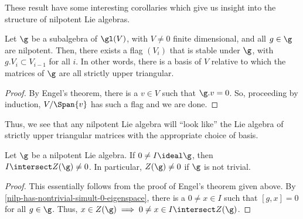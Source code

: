 \documentclass[11pt,leqno,oneside]{amsart}
\numberwithin{thm}{section}
\begin{document}
These result have some interesting corollaries which give us insight
into the structure of nilpotent Lie algebras. 
\begin{cor}
  Let \(\g\) be a subalgebra of \(\gl(V)\), with \(V \neq 0\) finite
  dimensional, and all \(g \in \g\) are nilpotent. Then, there exists
  a flag \((V_i)\) that is stable under \(\g\), with \(g.V_i \subset
  V_{i-1}\) for all \(i\). In other words, there is a basis of \(V\)
  relative to which the matrices of \(\g\) are all strictly upper
  triangular.
\end{cor}
\begin{proof}
  By Engel's theorem, there is a \(v \in V\) such that \(\g.v =
  0\). So, proceeding by induction, \(V/ \Span\{v\}\) has such a
  flag and we are done.
\end{proof}
Thus, we see that any nilpotent Lie algebra will ``look like'' the Lie
algebra of strictly upper triangular matrices with the appropriate
choice of basis.
\begin{cor}\label{nilpotent-has-nontrivial-center}
  Let \(\g\) be a nilpotent Lie algebra. If \(0 \neq I \ideal \g\),
  then \(I \intersect Z(\g) \neq 0\). In particular, \(Z(\g) \neq 0\)
  if \(\g\) is not trivial. 
\end{cor}
\begin{proof}
  This essentially follows from the proof of Engel's theorem given
  above. By \ref{nilp-has-nontrivial-simult-0-eigenspace}, there is
  a \(0 \neq x \in I\) such that \([g,x] = 0\) for all \(g \in
  \g\). Thus, \(x \in Z(\g) \implies 0 \neq x \in I \intersect
  Z(\g)\). 
\end{proof}
\end{document}
